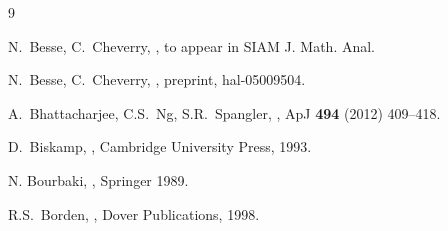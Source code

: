 \documentclass[11pt,reqno]{amsart}
\begin{document}
\begin{thebibliography}{9}
{\small

%

%

  \newblock  N.~Besse, C.~Cheverry,
  ,
  \newblock to appear in SIAM J. Math. Anal.



  \newblock  N.~Besse, C.~Cheverry,
  ,
  \newblock preprint, hal-05009504.


%
  
  \newblock  A.~Bhattacharjee, C.S.~Ng, S.R.~Spangler,
  ,
  \newblock ApJ {\bf 494} (2012) 409--418.

  
  \newblock D.~Biskamp,
  ,
  \newblock Cambridge University Press, 1993.


  \newblock N. Bourbaki,
  ,
  \newblock Springer 1989.


  \newblock R.S.~Borden,
  ,
  \newblock Dover Publications, 1998. 

  
}
\end{thebibliography}
\end{document}
